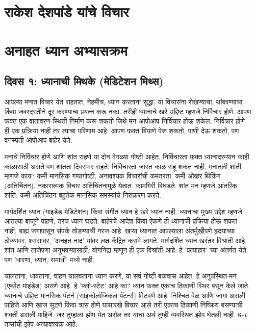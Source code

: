 \chapter*{राकेश देशपांडे  यांचे विचार }

\chapter{अनाहत  ध्यान अभ्यासक्रम}

\section*{दिवस १: ध्यानाची मिथके (मेडिटेशन मिथ्स)}

आपल्या मनात विचार येत राहतात, नेहमीच, ध्यान करताना सुद्धा. या विचारांना रोखण्याचा, थांबवण्याचा किंवा जबरदस्तीने दूर करण्याचा प्रयत्न करू नका. तरीही ध्यानाचे खरे उद्दिष्ट म्हणजे निर्विचार होणे. आपण फक्त एक वातावरण-स्थिती निर्माण करू शकतो जिथे मन आपोआप निर्विचार होऊ शकेल. निर्विचार होणे ही एक प्रक्रिया नाही तर त्याचा परिणाम आहे. आपण फक्त बियाणे पेरू शकतो, पाणी देऊ शकतो, पण वनस्पती आपोआप बाहेर येते.

मनाचे निर्विचार होणे आणि शांत राहणे या दोन वेगळ्या गोष्टी आहेत. निर्विचारता फक्त ध्यानादरम्यान काही काळासाठी असते पण शांतता दिवसभर राहते. निर्विचारता जास्त काळ राहू शकत नाही. मनातली शांती म्हणजे काय? कमी मानसिक गप्पागोष्टी. अनावश्यक विचारांची कमतरता. कमी ओव्हर थिंकिंग (अतिचिंतन). नकारात्मक विचार अतिचिंतनामुळे येतात. कामगिरी बिघडते. शांत मन म्हणजे आंतरिक शांति: कमी अतिचिंतन बहुतेक मानसिक समस्यांचे निराकरण करते.

मार्गदर्शित ध्यान (गाइडेड मेडिटेशन) किंवा संगीत ध्यान हे खरे ध्यान नाही. ध्यानाचा मुख्य उद्देश म्हणजे आतल्या बाजूने पाहणे, तरच ध्यान घडते. बाहेरचे आदेश किंवा ऐकणे ही ध्यानाची प्रक्रिया होऊ शकत नाही. बाह्य जगापासून संपर्क तोडण्याची गरज आहे. खर्‍या ध्यानात आपल्याला अंतर्मुखीपणे हृदयाच्या ठोक्यांवर, श्वासावर, 'अनहत नाद' यांवर लक्ष केंद्रित करावे लागते. मार्गदर्शित ध्यान खरंतर विश्रांती आहे, शांत आणि ताजेपणा अनुभवण्यासाठी. योगनिद्रा म्हणून ही एक विश्रांती आहे. हे 'प्रत्याहार' च्या अंतर्गत येते पण 'धारणा, ध्यान, समाधी' मध्ये नाही.

चालताना, धावताना, वाहन चालवताना ध्यान करणे, या सर्व गोष्टी बकवास आहेत. हे अनुपस्थित-मन (एब्सेंट माइंडेड) असणे आहे. हे 'फ्लो-स्टेट' आहे का? ध्यान फक्त एकाच ठिकाणी स्थिर बसून केले जाते. ध्यानाचे उद्दिष्ट मानसिक पॅटर्न (साइकोलॉजिकल पॅटर्न्स) मिटवणे आहे. निश्चित वेळ आणि जागा असली पाहिजे आणि खाज सुटणे किंवा त्रास होणे यासारखे विचार आले तरी एकाच ठिकाणी निष्क्रिय बसण्याची शक्ती असली पाहिजे. जर तुम्हाला झोप येत असेल तर याचा अर्थ तुम्ही व्यवस्थित झोप घेतली नाही. ७-८ तासांची झोप अत्यावश्यक आहे.


